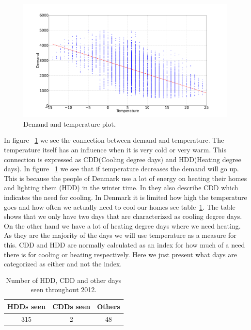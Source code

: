 \begin{figure}[H]
\centering
\includegraphics[width=0.99\textwidth ]{billeder/energy_price_plots/consump_temp.png}
\caption{Demand and temperature plot.}
\label{fig:consump_temp}
\end{figure}

In figure ~\ref{fig:consump_temp} we see the connection between demand and temperature. The temperature itself has an influence when it is very cold or very warm. This connection is expressed as CDD(Cooling degree days) and HDD(Heating degree days). In figure ~\ref{fig:consump_temp} we see that if temperature decreases the demand will go up. This is because the people of Denmark use a lot of energy on heating their homes and lighting them (HDD) in the winter time. In \cite{19} they also describe CDD which indicates the need for cooling. In Denmark it is limited how high the temperature goes and how often we actually need to cool our homes see table~\ref{table:CDD_HDD}. The table shows that we only have two days that are characterized as cooling degree days. On the other hand we have a lot of heating degree days where we need heating. As they are the majority of the days we will use temperature as a measure for this. CDD and HDD are normally calculated as an index for how much of a need there is for cooling or heating respectively. Here we just present what days are categorized as either and not the index.

\begin{table}[H]
\centering
\begin{tabular}{|c|c|c|} 
	\hline
HDDs seen & CDDs seen & Others \\ [0.5ex]
\hline
315 & 2 & 48 \\  \hline
\end{tabular}
\caption{Number of HDD, CDD and other days seen throughout 2012.} %
\label{table:CDD_HDD} %
\end{table}

